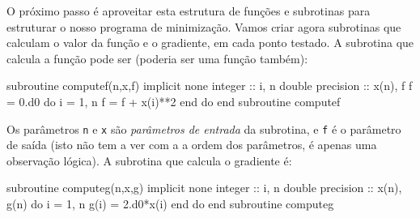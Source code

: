 \documentclass[10pt,a4paper,ssfamily]{exam}
\begin{document}
O próximo passo é aproveitar esta estrutura de funções e subrotinas para
estruturar o nosso programa de minimização. Vamos criar agora subrotinas
que calculam o valor da função e o gradiente, em cada ponto testado. A
subrotina que calcula a função pode ser (poderia ser uma função também):
\begin{code}
subroutine computef(n,x,f)
  implicit none
  integer :: i, n
  double precision :: x(n), f
  f = 0.d0
  do i = 1, n
    f = f + x(i)**2
  end do
end subroutine computef
\end{code}
Os parâmetros {\tt n} e {\tt x} são {\it parâmetros de entrada} da
subrotina, e {\tt f} é o parâmetro de saída (isto não tem a ver com a a
ordem dos parâmetros, é apenas uma observação lógica). 
A subrotina que calcula o gradiente é:
\begin{code}
subroutine computeg(n,x,g)
  implicit none
  integer :: i, n
  double precision :: x(n), g(n)
  do i = 1, n
    g(i) = 2.d0*x(i)
  end do
end subroutine computeg
\end{code}
\end{document}

